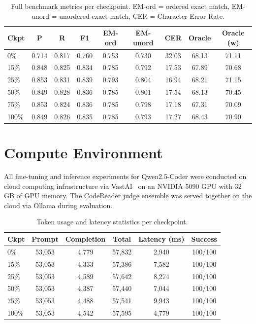 \documentclass[conference]{IEEEtran}
\begin{document}
\begin{table}[t]
  \centering
  \caption{Full benchmark metrics per checkpoint.
           EM-ord = ordered exact match,
           EM-unord = unordered exact match,
           CER = Character Error Rate.}
  \label{tab:results-full}
  \begin{tabular}{lcccccccc}
    \toprule
    \textbf{Ckpt} & \textbf{P} & \textbf{R} & \textbf{F1} &
    \textbf{EM-ord} & \textbf{EM-unord} & \textbf{CER} &
    \textbf{Oracle} & \textbf{Oracle (w)} \\
    \midrule
    0\%   & 0.714 & 0.817 & 0.760 & 0.753 & 0.730 & 32.03 & 68.13 & 71.11 \\
    15\%  & 0.848 & 0.825 & 0.834 & 0.785 & 0.792 & 17.53 & 67.89 & 70.68 \\
    25\%  & 0.853 & 0.831 & 0.839 & 0.793 & 0.804 & 16.94 & 68.21 & 71.15 \\
    50\%  & 0.849 & 0.828 & 0.836 & 0.785 & 0.801 & 17.54 & 68.13 & 70.45 \\
    75\%  & 0.853 & 0.824 & 0.836 & 0.785 & 0.798 & 17.18 & 67.31 & 70.09 \\
    100\% & 0.849 & 0.826 & 0.835 & 0.785 & 0.793 & 17.27 & 68.43 & 70.90 \\
    \bottomrule
  \end{tabular}
\end{table}

\section{Compute Environment}
\label{app:compute}

All fine-tuning and inference experiments for Qwen2.5-Coder were conducted on
cloud computing infrastructure via VastAI~\cite{vastai2024} on an NVIDIA 5090
GPU with 32 GB of GPU memory.
The CodeReader judge ensemble was served together on the cloud via Ollama during
evaluation.

\begin{table}[t]
  \centering
  \caption{Token usage and latency statistics per checkpoint.}
  \label{tab:usage}
  \begin{tabular}{lccccc}
    \toprule
    \textbf{Ckpt} & \textbf{Prompt} & \textbf{Completion} &
    \textbf{Total} & \textbf{Latency (ms)} & \textbf{Success} \\
    \midrule
    0\%   & 53,053 & 4,779 & 57,832 & 2,940 & 100/100 \\
    15\%  & 53,053 & 4,333 & 57,386 & 7,582 & 100/100 \\
    25\%  & 53,053 & 4,589 & 57,642 & 8,274 & 100/100 \\
    50\%  & 53,053 & 4,387 & 57,440 & 7,044 & 100/100 \\
    75\%  & 53,053 & 4,488 & 57,541 & 9,943 & 100/100 \\
    100\% & 53,053 & 4,542 & 57,595 & 4,779 & 100/100 \\
    \bottomrule
  \end{tabular}
\end{table}
\end{document}
